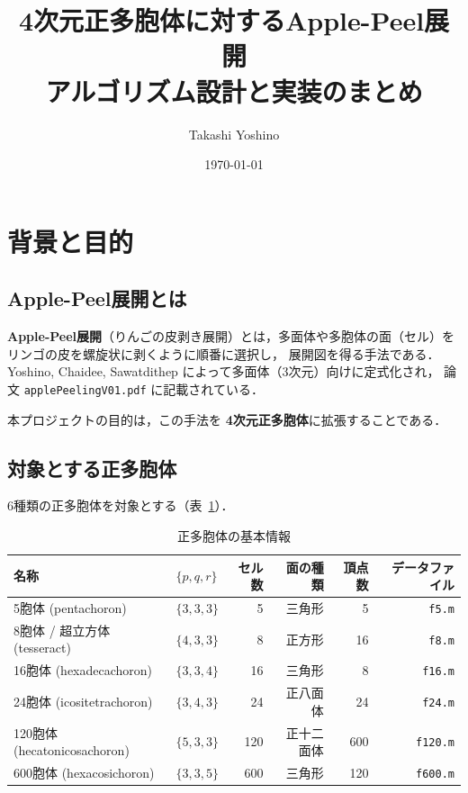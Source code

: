 \documentclass[12pt,a4paper]{article}
\title{\textbf{4次元正多胞体に対するApple-Peel展開}\\[0.4em]
  \large アルゴリズム設計と実装のまとめ}
\author{Takashi Yoshino}
\date{\today}
\theoremstyle{definition}
\begin{document}
\maketitle
\tableofcontents
\bigskip

\section{背景と目的}

\subsection{Apple-Peel展開とは}

\textbf{Apple-Peel展開}（りんごの皮剥き展開）とは，多面体や多胞体の面（セル）を
リンゴの皮を螺旋状に剥くように順番に選択し，
展開図を得る手法である．
Yoshino, Chaidee, Sawatdithep によって多面体（3次元）向けに定式化され，
論文 \texttt{applePeelingV01.pdf} に記載されている．

本プロジェクトの目的は，この手法を \textbf{4次元正多胞体}に拡張することである．

\subsection{対象とする正多胞体}

6種類の正多胞体を対象とする（表~\ref{tab:polytopes}）．

\begin{table}[h]
\centering
\caption{正多胞体の基本情報}
\label{tab:polytopes}
\small
\begin{tabular}{llrrrr}
\toprule
名称 & $\{p,q,r\}$ & セル数 & 面の種類 & 頂点数 & データファイル \\
\midrule
5胞体 (pentachoron)           & $\{3,3,3\}$ &   5 & 三角形   &   5 & \texttt{f5.m}  \\
8胞体 / 超立方体 (tesseract)  & $\{4,3,3\}$ &   8 & 正方形   &  16 & \texttt{f8.m}  \\
16胞体 (hexadecachoron)       & $\{3,3,4\}$ &  16 & 三角形   &   8 & \texttt{f16.m} \\
24胞体 (icositetrachoron)     & $\{3,4,3\}$ &  24 & 正八面体 &  24 & \texttt{f24.m} \\
120胞体 (hecatonicosachoron)  & $\{5,3,3\}$ & 120 & 正十二面体 & 600 & \texttt{f120.m}\\
600胞体 (hexacosichoron)      & $\{3,3,5\}$ & 600 & 三角形   & 120 & \texttt{f600.m}\\
\bottomrule
\end{tabular}
\end{table}
\end{document}
